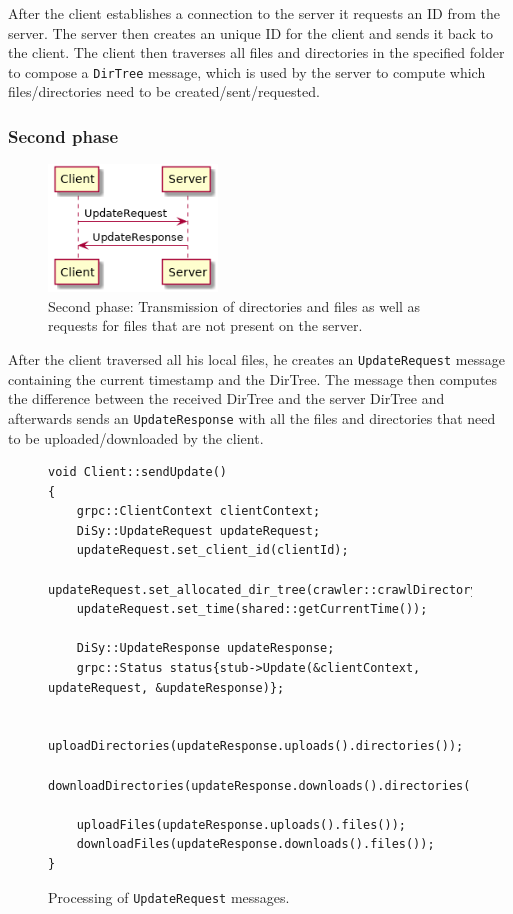 \documentclass[a4paper]{article}
\begin{document}
After the client establishes a connection to the server it requests an ID from the server. The server then creates an unique ID for the client and sends it back to the client. The client then traverses all files and directories in the specified folder to compose a \texttt{DirTree} message, which is used by the server to compute which files/directories need to be created/sent/requested.

\subsubsection{Second phase}
\begin{figure}[H]
\centering
\includegraphics[width=4.5cm]{second_stage}
\caption{Second phase: Transmission of directories and files as well as requests for files that are not present on the server.}
\label{fig:stage2}
\end{figure}

After the client traversed all his local files, he creates an \texttt{UpdateRequest} message containing the current timestamp and the DirTree. The message then computes the difference between the received DirTree and the server DirTree and afterwards sends an \texttt{UpdateResponse} with all the files and directories that need to be uploaded/downloaded by the client.

\begin{figure}[H]
\begin{verbatim}
void Client::sendUpdate()
{
	grpc::ClientContext clientContext;
	DiSy::UpdateRequest updateRequest;
	updateRequest.set_client_id(clientId);
	updateRequest.set_allocated_dir_tree(crawler::crawlDirectory(path));
	updateRequest.set_time(shared::getCurrentTime());
	
	DiSy::UpdateResponse updateResponse;
	grpc::Status status{stub->Update(&clientContext, updateRequest, &updateResponse)};
	
	uploadDirectories(updateResponse.uploads().directories());
	downloadDirectories(updateResponse.downloads().directories());
	
	uploadFiles(updateResponse.uploads().files());
	downloadFiles(updateResponse.downloads().files());
}
\end{verbatim}
\caption{Processing of \texttt{UpdateRequest} messages.}
\end{figure}
\end{document}
